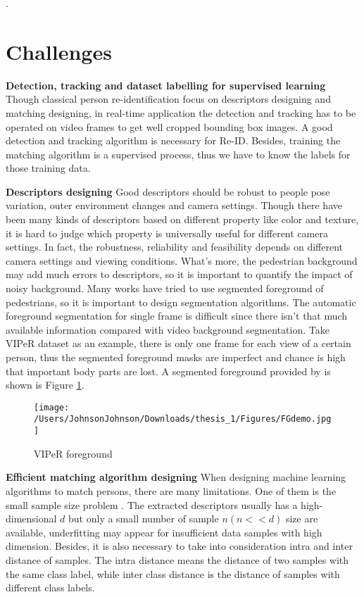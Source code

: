 .

\section{Challenges}

\textbf{Detection, tracking and dataset labelling for supervised learning} Though classical person re-identification focus on descriptors designing and matching designing, in real-time application the detection and tracking has to be operated on video frames to get well cropped bounding box images. A good detection and tracking algorithm is necessary for Re-ID. Besides, training the matching algorithm is a supervised process, thus we have to know the labels for those training data. 

\textbf{Descriptors designing} Good descriptors should be robust to people pose variation, outer environment changes and camera settings. Though there have been many kinds of descriptors based on different property like color and texture, it is hard to judge which property is universally useful for different camera settings. In fact, the robustness, reliability and feasibility depends on different camera settings and viewing conditions. What's more, the pedestrian background may add much errors to descriptors, so it is important to quantify the impact of noisy background. Many works have tried to use segmented foreground of pedestrians, so it is important to design segmentation algorithms. The automatic foreground segmentation for single frame is difficult since there isn't that much available information compared with video background segmentation. Take VIPeR dataset as an example, there is only one frame for each view of a certain person, thus the segmented foreground masks are imperfect and chance is high that important body parts are lost. A segmented foreground provided by \cite{SDALF} is shown is Figure \ref{VIPeRFG}.
\begin{figure}[H]
\centering
\texttt{[image: /Users/JohnsonJohnson/Downloads/thesis\_1/Figures/FGdemo.jpg]}
\vspace{-3em}
\caption{VIPeR foreground}
\label{VIPeRFG}
\end{figure}

\textbf{Efficient matching algorithm designing} 	
When designing machine learning algorithms to match persons, there are many limitations. One of them is the small sample size problem \cite{NFST}. The extracted descriptors usually has a high-dimensional $d$ but only a small number of sample $n(n<<d)$ size are available, underfitting may appear for insufficient data samples with high dimension. Besides, it is also necessary to take into consideration intra and inter distance of samples.
The intra distance means the distance of two samples with the same class label, while inter class distance is the distance of samples with different class labels. 

